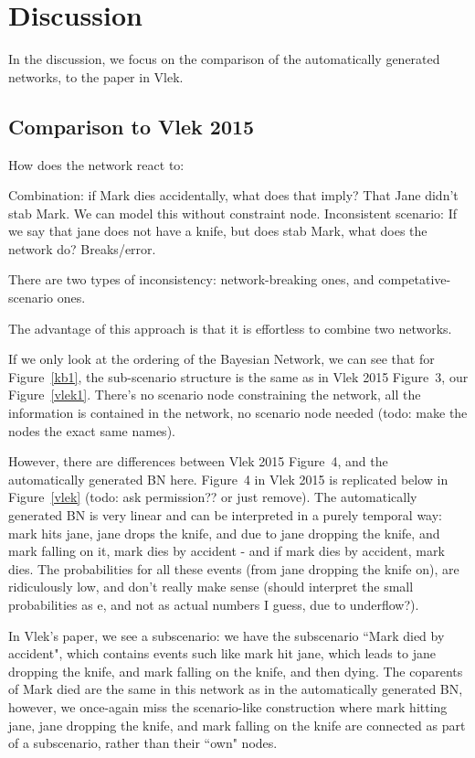 \section{Discussion}
In the discussion, we focus on the comparison of the automatically generated networks, to the paper in Vlek.



\subsection{Comparison to Vlek 2015}

How does the network react to:

Combination: if Mark dies accidentally, what does that imply? That Jane didn't stab Mark. We can model this without constraint node.
Inconsistent scenario: If we say that jane does not have a knife, but does stab Mark, what does the network do? Breaks/error. 

There are two types of inconsistency: network-breaking ones, and competative-scenario ones.

The advantage of this approach is that it is effortless to combine two networks.



If we only look at the ordering of the Bayesian Network, we can see that for Figure~\ref{kb1}, the sub-scenario structure is the same as in Vlek 2015 Figure~3, our Figure~\ref{vlek1}. There's no scenario node constraining the network, all the information is contained in the network, no scenario node needed (todo: make the nodes the exact same names).

However, there are differences between Vlek 2015 Figure~4, and the automatically generated BN here. Figure~4 in Vlek 2015 is replicated below in Figure~\ref{vlek} (todo: ask permission?? or just remove). The automatically generated BN is very linear and can be interpreted in a purely temporal way: mark hits jane, jane drops the knife, and due to jane dropping the knife, and mark falling on it, mark dies by accident - and if mark dies by accident, mark dies. The probabilities for all these events (from jane dropping the knife on), are ridiculously low, and don't really make sense (should interpret the small probabilities as e, and not as actual numbers I guess, due to underflow?). 

In Vlek's paper, we see a subscenario: we have the subscenario ``Mark died by accident", which contains events such like mark hit jane, which leads to jane dropping the knife, and mark falling on the knife, and then dying. The coparents of Mark died are the same in this network as in the automatically generated BN, however, we once-again miss the scenario-like construction where mark hitting jane, jane dropping the knife, and mark falling on the knife are connected as part of a subscenario, rather than their ``own" nodes.


